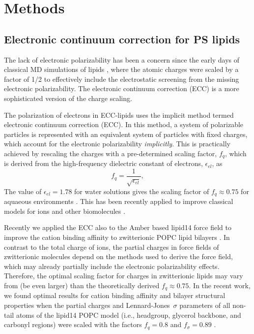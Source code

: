 \documentclass[journal=jpcbfk,manuscript=article]{achemso}
\begin{document}
 
\section{Methods} 
 
\subsection{Electronic continuum correction for PS lipids}\label{section:ecc} 

The lack of electronic polarizability has been a concern since the
early days of classical MD simulations of lipids \cite{jonsson86,egberts94, berendsen1996},
where the atomic charges were scaled by a factor of 1/2 to effectively
include the electrostatic screening from the missing electronic polarizability.
The electronic continuum correction (ECC) is a more sophisticated version of the charge scaling.

The polarization of electrons in ECC-lipids uses the implicit method termed electronic continuum correction (ECC). \cite{leontyev09, Pluharova2014, martinek17, melcr18} 
In this method, a system of polarizable particles is represented 
with an equivalent system of particles with fixed charges,
which account for the electronic polarizability \emph{implicitly}. 
This is practically achieved by rescaling the charges with a pre-determined scaling factor, $f_q$,
which is derived from the high-frequency dielectric constant of electrons, $\epsilon_{el}$, as
\begin{equation}
  f_q = \frac{1}{\sqrt{\epsilon_{el}}} ,
\end{equation}
The value of $\epsilon_{el} = 1.78$ for water solutions gives the scaling
factor of $f_q \approx 0.75$ for aquaeous environments \cite{leontyev09}.
This has been recently applied to improve classical models for ions and
other biomolecules \cite{Pluharova2014, martinek17, melcr18}
.

Recently we applied the ECC also to the Amber based lipid14 force field \cite{dickson14} to
improve the cation binding affinity to zwitterionic POPC lipid bilayers \cite{melcr18}.
In contrast to the total charge of ions, 
the partial charges in force fields of zwitterionic molecules
depend on the methods used to derive the force field, 
which may already partially include the
electronic polarizability effects. Therefore, the optimal scaling factor for charges in
zwitterionic lipids may vary from (be even larger) than the theoretically derived $f_q \approx 0.75$.
In the recent work, we found optimal results for cation binding affinity and
bilayer structural properties when the partial charges and Lennard-Jones~$\sigma$
parameters of all non-tail atoms of the lipid14 POPC model
(i.e., headgroup, glycerol backbone, and carbonyl regions) 
were scaled with the factors $f_q = 0.8$ and $f_\sigma = 0.89$  \cite{melcr18}.
\end{document}

